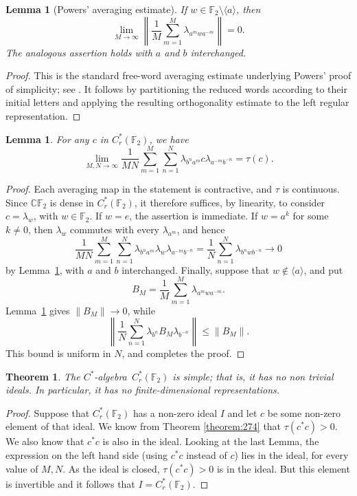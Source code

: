 \documentclass{book}
\newtheorem{lemma}[definition]{Lemma}
\newtheorem{theorem}[definition]{Theorem}
\def\cstar{\(C^*\)-algebra}
\begin{document}
\begin{lemma}[Powers' averaging estimate]\label{lemma:powers-averaging}
  If \(w\in\mathbb F_2\setminus\langle a\rangle\), then
  \[
    \lim_{M\to\infty}\left\|\frac1M\sum_{m=1}^M
    \lambda_{a^mwa^{-m}}\right\|=0.
  \]
  The analogous assertion holds with \(a\) and \(b\) interchanged.
\end{lemma}
\begin{proof}
  This is the standard free-word averaging estimate underlying Powers' proof of simplicity;
  see \cite{Powers1975}. It follows by partitioning the reduced words according to their initial
  letters and applying the resulting orthogonality estimate to the left regular representation.
\end{proof}
\begin{lemma}\label{lemma:277}
  For any \(c\) in \(C^*_r(\mathbb{F}_2)\), we have
  \[
    \lim_{M,N\rightarrow\infty}\frac{1}{MN} \sum^M_{m=1}\sum^N_{n=1}\lambda_{b^n a^m} c \lambda_{a^{-m}b^{-n}}=\tau(c).\]
\end{lemma}
\begin{proof}
  Each averaging map in the statement is contractive, and \(\tau\) is continuous. Since
  \(\mathbb C\mathbb F_2\) is dense in \(C_r^*(\mathbb F_2)\), it therefore suffices, by linearity,
  to consider \(c=\lambda_w\), with \(w\in\mathbb F_2\). If \(w=e\), the assertion is immediate.
  If \(w=a^k\) for some \(k\neq0\), then \(\lambda_w\) commutes with every \(\lambda_{a^m}\), and hence
  \[
    \frac{1}{MN}\sum_{m=1}^M\sum_{n=1}^N
    \lambda_{b^na^m}\lambda_w\lambda_{a^{-m}b^{-n}}
    =\frac1N\sum_{n=1}^N\lambda_{b^nwb^{-n}}\longrightarrow0
  \]
  by Lemma~\ref{lemma:powers-averaging}, with \(a\) and \(b\) interchanged. Finally, suppose that
  \(w\notin\langle a\rangle\), and put
  \[
    B_M=\frac1M\sum_{m=1}^M\lambda_{a^mwa^{-m}}.
  \]
  Lemma~\ref{lemma:powers-averaging} gives \(\|B_M\|\to0\), while
  \[
    \left\|\frac1N\sum_{n=1}^N\lambda_{b^n}B_M\lambda_{b^{-n}}\right\|
    \leq\|B_M\|.
  \]
  This bound is uniform in \(N\), and completes the proof.
\end{proof}
\begin{theorem}\label{theorem:272}
  The \cstar\ \(C^*_r(\mathbb{F}_2)\) is simple; that is, it has no non
  trivial ideals. In particular, it has no finite-dimensional representations.
\end{theorem}
\begin{proof}
  Suppose that \(C^*_r(\mathbb{F}_2)\) has a
  non-zero ideal \(I\) and let \(c\) be some non-zero element of that ideal. We know
  from Theorem \ref{theorem:274} that \(\tau(c^*c)>0\). We also know that \(c^*c\) is also in the
  ideal. Looking at the last Lemma, the expression on the left hand side (using
  \(c^*c\) instead of \(c\)) lies in the ideal, for every value of \(M,N\). As the ideal is
  closed, \(\tau(c^*c)>0\) is in the ideal. But this element is invertible and it follows
  that \(I=C^*_r(\mathbb{F}_2)\).
\end{proof}
\end{document}
